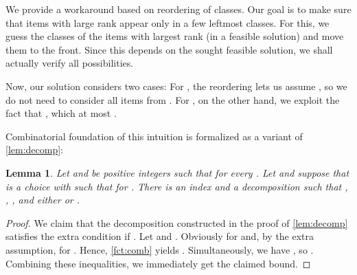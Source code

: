 \documentclass{article}
\theoremstyle{plain}
\newtheorem{lemma}[theorem]{Lemma}
\theoremstyle{definition}
\begin{document}
    We provide a workaround based on reordering of classes.
    Our goal is to make sure that items with large rank appear only in a few leftmost classes.
    For this, we guess the classes of the  items with largest rank (in a feasible solution) and move them to the front.
    Since this depends on the sought feasible solution, we shall actually verify all  possibilities.
    
    Now, our solution considers two cases:
    For , the reordering lets us assume , so we do not need
    to consider all items from .
    For , on the other hand, we exploit the fact that ,
    which at most .
         
    Combinatorial foundation of this intuition is formalized as a variant of \cref{lem:decomp}:
     
  \begin{lemma}\label{lem:decomp2}
  Let  and  be positive integers such that   for every .
  Let  and suppose that  is a choice with  such that  for .
    There is an index  and a decomposition 
  such that , , , and either  or .
  \end{lemma}
  \begin{proof}
  We claim that the decomposition constructed in the proof of \cref{lem:decomp} satisfies the extra 
  condition if . Let  and .
  Obviously  for  and, by the extra assumption,  for . Hence, \cref{fct:comb} yields . Simultaneously, we have ,
  so . Combining these inequalities, we immediately get the claimed bound.
  \end{proof}
    
\end{document}
